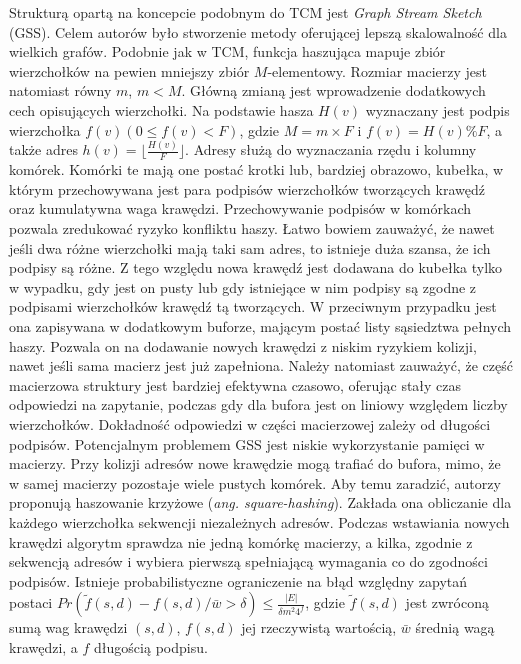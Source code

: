     Strukturą opartą na koncepcie podobnym do TCM jest \emph{Graph Stream Sketch} (GSS)\cite{Gou_Zou_Zhao_Yang_2019}. Celem autorów było stworzenie metody oferującej lepszą skalowalność dla wielkich grafów. Podobnie jak w TCM, funkcja haszująca mapuje zbiór wierzchołków na pewien mniejszy zbiór $M$-elementowy. Rozmiar macierzy jest natomiast równy $m$, $m < M$. Główną zmianą jest wprowadzenie dodatkowych cech opisujących wierzchołki. Na podstawie hasza $H(v)$ wyznaczany jest  podpis wierzchołka $f(v) (0 \leq f(v) < F)$, gdzie $M = m \times F$ i $f(v) = H(v)\%F$, a także adres $h(v) = \lfloor \frac{H(v)}{F} \rfloor$. Adresy służą do wyznaczania rzędu i kolumny komórek. Komórki te mają one postać krotki lub, bardziej obrazowo, kubełka, w którym przechowywana jest para podpisów wierzchołków tworzących krawędź oraz kumulatywna waga krawędzi. Przechowywanie podpisów w komórkach pozwala zredukować ryzyko konfliktu haszy. Łatwo bowiem zauważyć, że nawet jeśli dwa różne wierzchołki mają taki sam adres, to istnieje duża szansa, że ich podpisy są różne. Z tego względu nowa krawędź jest dodawana do kubełka tylko w wypadku, gdy jest on pusty lub gdy istniejące w nim podpisy są zgodne z podpisami wierzchołków krawędź tą tworzących. W przeciwnym przypadku jest ona zapisywana w dodatkowym buforze, mającym postać listy sąsiedztwa pełnych haszy. Pozwala on na dodawanie nowych krawędzi z niskim ryzykiem kolizji, nawet jeśli sama macierz jest już zapełniona. Należy natomiast zauważyć, że część macierzowa struktury jest bardziej efektywna czasowo, oferując stały czas odpowiedzi na zapytanie, podczas gdy dla bufora jest on liniowy względem liczby wierzchołków. Dokładność odpowiedzi w części macierzowej zależy od długości podpisów. Potencjalnym problemem GSS jest niskie wykorzystanie pamięci w macierzy. Przy kolizji adresów nowe krawędzie mogą trafiać do bufora, mimo, że w samej macierzy pozostaje wiele pustych komórek. Aby temu zaradzić, autorzy proponują haszowanie krzyżowe (\emph{ang. square-hashing}). Zakłada ona obliczanie dla każdego wierzchołka sekwencji niezależnych adresów. Podczas wstawiania nowych krawędzi algorytm sprawdza nie jedną komórkę macierzy, a kilka, zgodnie z sekwencją adresów i wybiera pierwszą spełniającą wymagania co do zgodności podpisów. Istnieje probabilistyczne ograniczenie na błąd względny zapytań postaci $Pr(\tilde{f}(s,d) - f(s,d) / \bar{w} > \delta) \leq \frac{|E|}{\delta m^2 4^{f}}$, gdzie $\tilde{f}(s,d)$ jest zwróconą sumą wag krawędzi $(s,d)$, $f(s,d)$ jej rzeczywistą wartością, $\bar{w}$ średnią wagą krawędzi, a $f$ długością podpisu.

